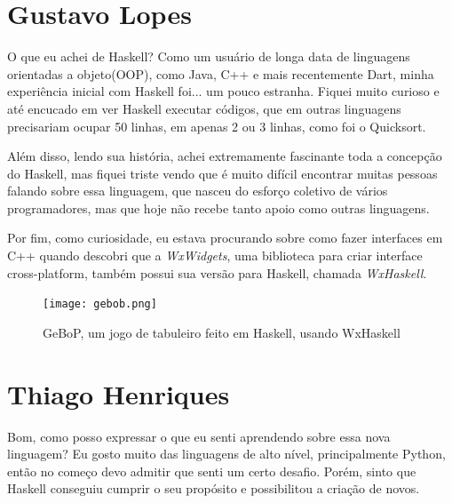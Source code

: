 \documentclass[
  12pt,				         %
  oneside,			       %
  a4paper,			       %
  english,		       	 %
  brazil,			      	 %
]{abntex2}
\begin{document}
    
    \begin{apendicesenv}
      
        \partapendices

        \setcounter{chapter}{0}
        \renewcommand{\thechapter}{\Alph{chapter}}%

        \chapter{Gustavo Lopes}

        O que eu achei de Haskell? Como um usuário de longa data de linguagens orientadas a objeto(OOP), 
        como Java, C++ e mais recentemente Dart, minha experiência inicial com Haskell foi...
        um pouco estranha. Fiquei muito curioso e até encucado em ver Haskell executar códigos, que em
        outras linguagens precisariam ocupar 50 linhas, em apenas 2 ou 3 linhas, como foi o Quicksort.

        Além disso, lendo sua história, achei extremamente fascinante toda a concepção do Haskell,
        mas fiquei triste vendo que é muito difícil encontrar muitas pessoas falando sobre essa linguagem, que nasceu 
        do esforço coletivo de vários programadores, mas que hoje não recebe tanto apoio como outras linguagens.

        Por fim, como curiosidade, eu estava procurando sobre como fazer interfaces em C++ quando
        descobri que a \emph{WxWidgets}, uma biblioteca para criar interface cross-platform, também possui 
        sua versão para Haskell, chamada \emph{WxHaskell}.

        \begin{figure}[ht]
          \texttt{[image: gebob.png]}
          \caption{GeBoP, um jogo de tabuleiro feito em Haskell, usando WxHaskell}
        \end{figure}

        \newpage

        \chapter{Thiago Henriques}
        
        Bom, como posso expressar o que eu senti aprendendo sobre essa nova linguagem? Eu gosto muito das linguagens de alto nível, principalmente Python,
        então no começo devo admitir que senti um certo desafio. Porém, sinto que Haskell conseguiu cumprir o 
        seu propósito e possibilitou a criação de novos.


\end{apendicesenv}
\end{document}
